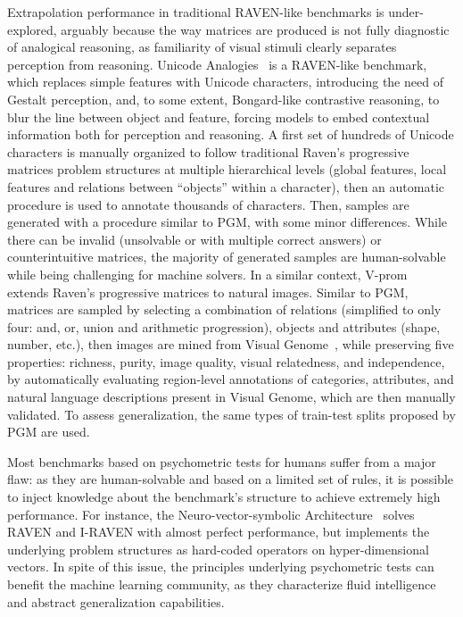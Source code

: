 Extrapolation performance in traditional RAVEN-like benchmarks is under-explored, arguably because the way matrices are produced is not fully diagnostic of analogical reasoning, as familiarity of visual stimuli clearly separates perception from reasoning.
Unicode Analogies~\cite{spratley2023unicode} is a RAVEN-like benchmark, which replaces simple features with Unicode characters, introducing the need of Gestalt perception, and, to some extent, Bongard-like contrastive reasoning, to blur the line between object and feature, forcing models to embed contextual information both for perception and reasoning.
A first set of hundreds of Unicode characters is manually organized to follow traditional Raven's progressive matrices problem structures at multiple hierarchical levels (global features, local features and relations between ``objects'' within a character), then an automatic procedure is used to annotate thousands of characters.
Then, samples are generated with a procedure similar to PGM, with some minor differences.
While there can be invalid (unsolvable or with multiple correct answers) or counterintuitive matrices, the majority of generated samples are human-solvable while being challenging for machine solvers.
In a similar context, V-prom~\cite{teney2020v} extends Raven's progressive matrices to natural images.
Similar to PGM, matrices are sampled by selecting a combination of relations (simplified to only four: and, or, union and arithmetic progression), objects and attributes (shape, number, etc.), then images are mined from Visual Genome~\cite{krishna2017visual}, while preserving five properties: richness, purity, image quality, visual relatedness, and independence, by automatically evaluating region-level annotations of categories, attributes, and natural language descriptions present in Visual Genome, which are then manually validated.
To assess generalization, the same types of train-test splits proposed by PGM are used.

Most benchmarks based on psychometric tests for humans suffer from a major flaw: as they are human-solvable and based on a limited set of rules, it is possible to inject knowledge about the benchmark's structure to achieve extremely high performance. For instance, the Neuro-vector-symbolic Architecture~\cite{hersche2023neuro} solves RAVEN and I-RAVEN with almost perfect performance, but implements the underlying problem structures as hard-coded operators on hyper-dimensional vectors.
In spite of this issue, the principles underlying psychometric tests can benefit the machine learning community, as they characterize fluid intelligence and abstract generalization capabilities.

